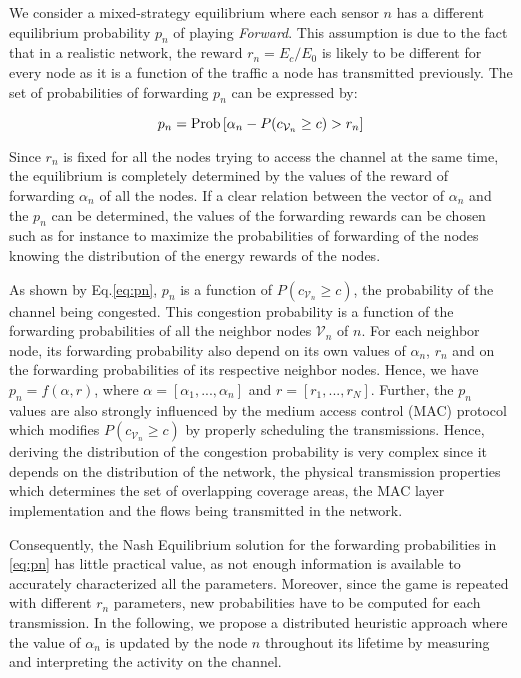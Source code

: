 \documentclass[journal, peerreview, onecolumn, draftcls]{IEEEtran}
\begin{document}
We consider a mixed-strategy equilibrium where each sensor $n$ has a different equilibrium probability $p_n$ of playing {\it Forward}. This assumption is due to the fact that in a realistic network, the reward $r_n=E_c/E_0$ is likely to be different for every node as it is a function of the traffic a node has transmitted previously. The set of probabilities of forwarding $p_n$ can be expressed by:

\begin{equation}
p_n = {\rm Prob}\left[ \alpha_n-P(c_{\mathcal{V}_n}\geq c)>r_n \right]
\label{eq:pn}
\end{equation}

Since $r_n$ is fixed for all the nodes trying to access the channel at the same time, the equilibrium is completely determined by the values of the reward of forwarding $\alpha_n$ of all the nodes. If a clear relation between the vector of $\alpha_n$ and the $p_n$ can be determined, the values of the forwarding rewards can be chosen such as for instance to maximize the probabilities of forwarding of the nodes knowing the distribution of the energy rewards of the nodes.

As shown by Eq.\eqref{eq:pn}, $p_n$ is a function of $P(c_{\mathcal{V}_n}\geq c)$, the probability of the channel being congested. This congestion probability is a function of the forwarding probabilities of all the neighbor nodes $\mathcal{V}_n$ of $n$. For each neighbor node, its forwarding probability also depend on its own values of $\alpha_n$, $r_n$ and on the forwarding probabilities of its respective neighbor nodes. Hence, we have $p_n = f(\alpha, r)$, where $\alpha = [\alpha_1, ..., \alpha_n]$ and $r=[r_1, ..., r_N]$.
Further, the $p_n$ values are also strongly influenced by the medium access control (MAC) protocol which modifies $P(c_{\mathcal{V}_n}\geq c)$ by properly scheduling the transmissions.
Hence, deriving the distribution of the congestion probability is very complex since it depends on the distribution of the network, the physical transmission properties which determines the set of overlapping coverage areas, the MAC layer implementation and the flows being transmitted in the network.

Consequently, the Nash Equilibrium solution for the forwarding probabilities in \eqref{eq:pn} has little practical value, as not enough information is available to accurately characterized all the parameters. Moreover, since the game is repeated with different $r_n$ parameters, new probabilities have to be computed for each transmission. In the following, we propose a distributed heuristic approach where the value of $\alpha_n$ is updated by the node $n$ throughout its lifetime by measuring and interpreting the activity on the channel.
\end{document}
